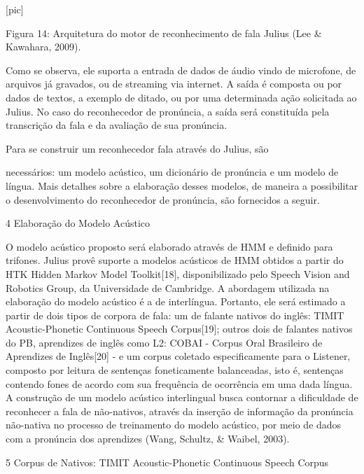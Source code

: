                                 [pic]

Figura 14: Arquitetura do motor de reconhecimento de fala Julius (Lee \&
Kawahara, 2009).

Como se observa, ele suporta a entrada de dados de \'audio vindo de
microfone, de arquivos j\'a gravados, ou de streaming via internet. A
sa\'ida \'e composta ou por dados de textos, a exemplo de ditado, ou por uma
determinada a\c{c}\~ao solicitada ao Julius. No caso do reconhecedor de
pron\'uncia, a sa\'ida ser\'a constitu\'ida pela transcri\c{c}\~ao da fala e da
avalia\c{c}\~ao de sua pron\'uncia.

  Para  se  construir  um  reconhecedor  fala  atrav\'es  do  Julius,  s\~ao

necess\'arios: um modelo ac\'ustico, um dicion\'ario de pron\'uncia e um modelo
de l\'ingua. Mais detalhes sobre a elabora\c{c}\~ao desses modelos, de maneira a
possibilitar o desenvolvimento do reconhecedor de pron\'uncia, s\~ao
fornecidos a seguir.

4 Elabora\c{c}\~ao do Modelo Ac\'ustico

O modelo ac\'ustico proposto ser\'a elaborado atrav\'es de HMM e definido para
trifones. Julius prov\^e suporte a modelos ac\'usticos de HMM obtidos a
partir do HTK Hidden Markov Model Toolkit{[}18{]}, disponibilizado pelo
Speech Vision and Robotics Group, da Universidade de Cambridge. A
abordagem utilizada na elabora\c{c}\~ao do modelo ac\'ustico \'e a de interl\'ingua.
Portanto, ele ser\'a estimado a partir de dois tipos de corpora de fala:
um de falante nativos do ingl\^es: TIMIT Acoustic-Phonetic Continuous
Speech Corpus{[}19{]}; outros dois de falantes nativos do PB, aprendizes
de ingl\^es como L2: COBAI - Corpus Oral Brasileiro de Aprendizes de
Ingl\^es{[}20{]} - e um corpus coletado especificamente para o Listener,
composto por leitura de senten\c{c}as foneticamente balanceadas, isto \'e,
senten\c{c}as contendo fones de acordo com sua frequ\^encia de ocorr\^encia em
uma dada l\'ingua. A constru\c{c}\~ao de um modelo ac\'ustico interlingual busca
contornar a dificuldade de reconhecer a fala de n\~ao-nativos, atrav\'es da
inser\c{c}\~ao de informa\c{c}\~ao da pron\'uncia n\~ao-nativa no processo de
treinamento do modelo ac\'ustico, por meio de dados com a pron\'uncia dos
aprendizes (Wang, Schultz, \& Waibel, 2003).

5 Corpus de Nativos: TIMIT Acoustic-Phonetic Continuous Speech Corpus

